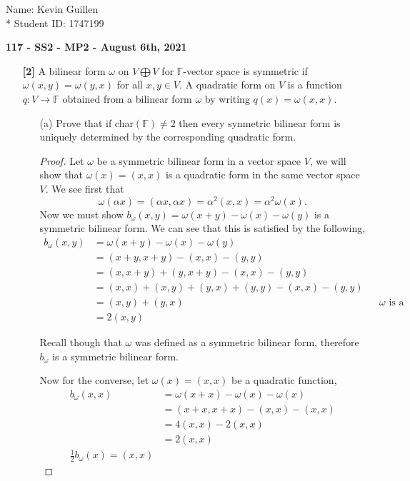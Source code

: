 \documentclass[12pt]{article}
\newcommand      {\Fm}          {{\mathbb F}}
\begin{document}
\begin{flushright}
    Name: Kevin Guillen \\*
    Student ID: 1747199
\end{flushright}
\begin{center}
    {\bf 117 - SS2 - MP2 - August 6th, 2021}
\end{center}

\begin{itemize}
    \item[\textbf{[2]}] A bilinear form $\omega$ on $V \bigoplus V $ for $\Fm$-vector space is symmetric if $\omega(x,y) = \omega(y,x)$ for all $x,y \in V$. A quadratic form on $V$ is a function $q:V\to \Fm$ obtained from a bilinear form $\omega$ by writing $q(x) = \omega(x,x)$.
    \begin{itemize}
        \item[(a)] Prove that if char$(\Fm)\neq 2$ then every synmetric bilinear form is uniquely determined by the corresponding quadratic form. 
        \begin{proof}
            Let $\omega$ be a symmetric bilinear form in a vector space $V$, we will show that $\omega(x) = (x,x)$ is a quadratic form in the same vector space $V$. We see first that \[\omega(\alpha x) = (\alpha x, \alpha x) = \alpha^2(x,x) = \alpha^2 \omega(x).\] Now we must show $b_\omega(x,y) = \omega(x+y) -\omega(x) - \omega(y)$ is a symmetric bilinear form. We can see that this is satisfied by the following,
            \begin{align*}
                b_\omega(x,y) &= \omega(x+y) - \omega(x) - \omega(y) \\
                &= (x+y, x+y) - (x,x) - (y,y) \\ 
                &= (x,x+y) + (y,x+y) - (x,x) - (y,y) \\
                &= (x,x) + (x,y) + (y,x) + (y,y) - (x,x) - (y,y) \\
                &= (x,y) + (y,x) && \text{$\omega$ is a symmetric bilinear form so,} \\
                &= 2(x,y)
            \end{align*}

            Recall though that $\omega$ was defined as a symmetric bilinear form, therefore $b_\omega$ is a symmetric bilinear form.
            
            Now for the converse, let $\omega(x) = (x,x)$ be a quadratic function,
            \begin{align*}
                b_\omega(x,x) &= \omega(x+x) - \omega(x) - \omega(x) \\
                &= (x+x, x+x) - (x,x) - (x,x) \\
                &= 4(x,x) - 2(x,x) \\
                &= 2(x,x) \\
                \frac{1}{2}b_\omega(x) = (x,x)
            \end{align*}
        \end{proof}


\end{itemize}
\end{itemize}
\end{document}
